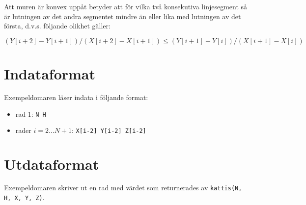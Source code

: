 Att muren är konvex uppåt betyder att för vilka två konsekutiva linjesegment så är lutningen av det andra segmentet mindre än eller lika med lutningen av det första, d.v.s. följande olikhet gäller:

$$(Y[i+2] - Y[i+1]) / (X[i+2] - X[i+1]) \le (Y[i+1] - Y[i]) / (X[i+1] - X[i])$$

\section*{Indataformat}
Exempeldomaren läser indata i följande format:

\begin{itemize}
  \item rad $1$: \texttt{N H}
  \item rader $i = 2 \dots N+1$: \texttt{X[i-2] Y[i-2] Z[i-2]}
\end{itemize}

\section*{Utdataformat}
Exempeldomaren skriver ut en rad med värdet som returnerades av \texttt{kattis(N, H, X, Y, Z)}.

